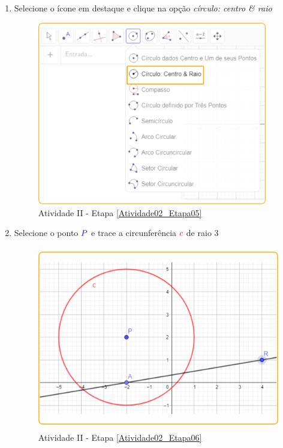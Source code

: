 \documentclass[11pt,a4paper]{article}
\begin{document}
\begin{enumerate}[{Etapa} 1.]
\item Selecione o ícone em destaque e clique na opção {\it círculo: centro \& raio} \label{Atividade02_Etapa05}
\begin{figure}[H]
    \centering
    \includegraphics[height=8cm]{Figuras/T01_Elemento07.png}
    \caption{Atividade II - Etapa \ref{Atividade02_Etapa05}}
    \label{Atividade02_Etapa05_Imagem}
\end{figure}

\item Selecione o ponto ${\color{blue}{P}}$ e trace a circunferência ${\color{red}{c}}$ de raio $3$ \label{Atividade02_Etapa06}
\begin{figure}[H]
    \centering
    \includegraphics[height=8cm]{Figuras/T01_Atividade02_Fig03.png}
    \caption{Atividade II - Etapa \ref{Atividade02_Etapa06}}
    \label{Atividade02_Etapa06_Imagem}
\end{figure}


\end{enumerate}
\end{document}
